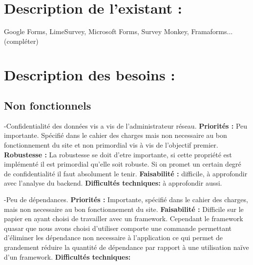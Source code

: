 \documentclass{article}
\begin{document}
\section{Description de l'existant :}

Google Forms, LimeSurvey, Microsoft Forms, Survey Monkey, Framaforms... (compléter)

\section{Description des besoins :}
\subsection{Non fonctionnels}

-Confidentialité des données vis a vis de l'administrateur réseau.\newline
\textbf{Priorités : }Peu importante. Spécifié dans le cahier des charges mais non necessaire au bon fonctionnement du site et non primordial vis à vis de l'objectif premier. \newline
\textbf{Robustesse : } La robustesse se doit d'etre importante, si cette propriété est implémenté il est primordial qu'elle soit robuste. Si on promet un certain degré de confidentialité il faut absolument le tenir.\newline
\textbf{Faisabilité : } difficile, à approfondir avec l'analyse du backend.\newline
\textbf{Difficultés techniques: } à approfondir aussi.\newline\newline

-Peu de dépendances.\newline
\textbf{Priorités : }Importante, spécifié dans le cahier des charges, mais non necessaire au bon fonctionnement du site. \newline
\textbf{Faisabilité : } Difficile sur le papier en ayant choisi de travailler avec un framework. Cependant le framework quasar que nous avons choisi d'utiliser comporte une commande permettant d'éliminer les dépendance non necessaire à l'application ce qui permet de grandement réduire la quantité de dépendance par rapport à une utilisation naïve d'un framework.\newline
\textbf{Difficultés techniques: }\newline\newline
\end{document}
